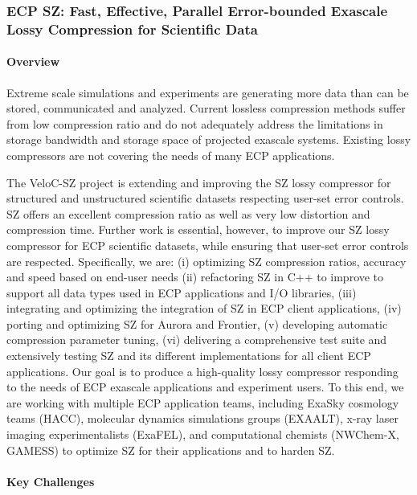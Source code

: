 \subsubsection{ ECP SZ: Fast, Effective, Parallel Error-bounded Exascale Lossy Compression for Scientific Data}

\paragraph{Overview}

Extreme scale simulations and experiments are generating more data than can be stored, communicated and analyzed. Current lossless compression methods suffer from low compression ratio and do not adequately address the limitations in storage bandwidth and storage space of projected exascale systems. Existing lossy compressors are not covering the needs of many ECP applications.

The VeloC-SZ project is extending and improving the SZ lossy compressor for structured and unstructured scientific datasets respecting user-set error controls. SZ offers an excellent compression ratio as well as very low distortion and compression time. Further work is essential, however, to improve our SZ lossy compressor for ECP scientific datasets, while ensuring that user-set error controls are respected. Specifically, we are: (i) optimizing SZ compression ratios, accuracy and speed based on end-user needs (ii) refactoring SZ in C++ to improve to support all data types used in ECP applications and I/O libraries, (iii) integrating and optimizing the integration of SZ in ECP client applications, (iv)  porting and optimizing SZ for Aurora and Frontier, (v) developing automatic compression parameter tuning, (vi) delivering a comprehensive test suite and extensively testing SZ and its different implementations for all client ECP applications. Our goal is to produce a high-quality lossy compressor responding to the needs of ECP exascale applications and experiment users. To this end, we are working with multiple ECP application teams, including ExaSky cosmology teams (HACC), molecular dynamics simulations groups (EXAALT), x-ray laser imaging experimentalists (ExaFEL), and computational chemists (NWChem-X, GAMESS) to optimize SZ for their applications and to harden SZ.

\paragraph{Key Challenges}


